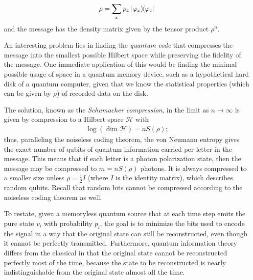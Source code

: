 \documentclass[a4paper, 12pt]{article}
\numberwithin{equation}{section}
\numberwithin{figure}{section}
\theoremstyle{definition}
\begin{document}
    \begin{align}
        \rho = \sum_x p_x \dyad{\varphi_x}{\varphi_x}
    \end{align}
    and the message has the density matrix given by the tensor product $\rho^n$. \par
    An interesting problem lies in finding the \textit{quantum code} that compresses the message into the smallest possible Hilbert space while preserving the fidelity of the message. One immediate application of this would be finding the minimal possible usage of space in a quantum memory device, such as a hypothetical hard disk of a quantum computer, given that we know the statistical properties (which can be given by $\rho$) of recorded data on the disk. \par
    The solution, known as the \textit{Schumacher compression}, in the limit as $n \to \infty$ is given by compression to a Hilbert space $\mathcal{H}$ with
    \begin{align}
        \log(\dim \mathcal{H}) = n S(\rho);
    \end{align}
    thus, paralleling the noiseless coding theorem, the von Neumann entropy gives the exact number of qubits of quantum information carried per letter in the message. This means that if each letter is a photon polarization state, then the message may be compressed to $m = n S(\rho)$ photons. It is always compressed to a smaller size unless $\rho = \frac{1}{2} I$ (where $I$ is the identity matrix), which describes random qubits. Recall that random bits cannot be compressed according to the noiseless coding theorem as well. \par

    To restate, given a memoryless quantum source that at each time step emits the pure state $v_i$ with probability $p_i$, the goal is to minimize the bits used to encode the signal in a way that the original state can still be reconstructed, even though it cannot be perfectly transmitted. Furthermore, quantum information theory differs from the classical in that the original state cannot be reconstructed perfectly most of the time, because the state to be reconstructed is nearly indistinguishable from the original state almost all the time. \par
\end{document}
